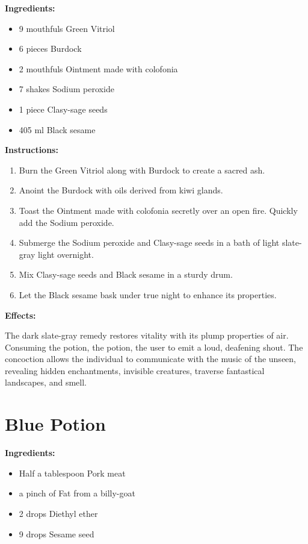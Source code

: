 \documentclass{article}
\begin{document}
\textbf{Ingredients:}

\begin{itemize}
  \item 9 mouthfuls Green Vitriol
  \item 6 pieces Burdock
  \item 2 mouthfuls Ointment made with colofonia
  \item 7 shakes Sodium peroxide
  \item 1 piece Clasy-sage seeds
  \item 405 ml Black sesame
\end{itemize}

\textbf{Instructions:}

\begin{enumerate}
  \item Burn the Green Vitriol along with Burdock to create a sacred ash.
  \item Anoint the Burdock with oils derived from kiwi glands.
  \item Toast the Ointment made with colofonia secretly over an open fire. Quickly add the Sodium peroxide.
  \item Submerge the Sodium peroxide and Clasy-sage seeds in a bath of light slate-gray light overnight.
  \item Mix Clasy-sage seeds and Black sesame in a sturdy drum.
  \item Let the Black sesame bask under true night to enhance its properties.
\end{enumerate}

\textbf{Effects:}

The dark slate-gray remedy restores vitality with its plump properties of air. Consuming the potion, the potion, the user to emit a loud, deafening shout. The concoction allows the individual to communicate with the music of the unseen, revealing hidden enchantments, invisible creatures, traverse fantastical landscapes, and smell.

\newpage
\section*{Blue Potion}

\textbf{Ingredients:}

\begin{itemize}
  \item Half a tablespoon Pork meat
  \item a pinch of Fat from a billy-goat
  \item 2 drops Diethyl ether
  \item 9 drops Sesame seed
\end{itemize}
\end{document}
